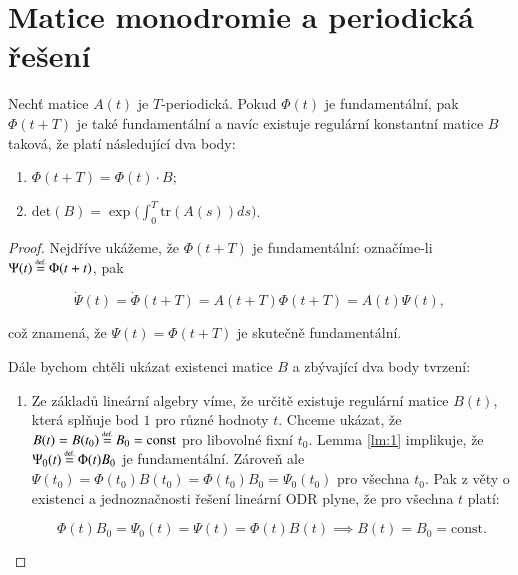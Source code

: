 \section{Matice monodromie a periodická řešení}\label{sec:monodromy_matrix_and_periodic_solutions}

\begin{thrm}\label{thrm:monodromy_matrix}
	Nechť matice $A(t)$ je $T$-periodická. Pokud $\Phi(t)$ je fundamentální, pak $\Phi(t+T)$ je také fundamentální a navíc existuje regulární konstantní matice $B$ taková, že platí následující dva body:
	
	\begin{enumerate}
		\item $\Phi(t+T) = \Phi(t) \cdot B$;
		\item $\mathrm{det} (B) = \exp \big( \int_{0}^{T} \mathrm{tr} (A(s)) ds \big) $.
	\end{enumerate}

	\begin{proof}
		Nejdříve ukážeme, že $\Phi(t+T)$ je fundamentální: označíme-li $\Psi(t) \defeq \Phi(t+t)$, pak
		
		\begin{equation}
			\dot{\Psi}(t) = \dot{\Phi}(t+T) = A(t+T) \Phi(t+T) = A(t) \Psi(t),
		\end{equation}
		
		\noindent
		což znamená, že $\Psi(t) = \Phi(t+T)$ je skutečně fundamentální.
		
		\medskip
		
		Dále bychom chtěli ukázat existenci matice $B$ a zbývající dva body tvrzení:
		
		\begin{enumerate}
			\item Ze základů lineární algebry víme, že určitě existuje regulární matice $B(t)$, která splňuje bod $1$ pro různé hodnoty $t$. Chceme ukázat, že $B(t) = B(t_{0}) \defeq B_{0} = \mathrm{const}$ pro libovolné fixní $t_{0}$. Lemma \ref{lm:1} implikuje, že $\Psi_{0}(t) \defeq \Phi(t) B_{0}$ je fundamentální. Zároveň ale $\Psi(t_{0}) = \Phi(t_{0}) B(t_{0}) = \Phi(t_{0}) B_{0} = \Psi_{0}(t_{0})$ pro všechna $t_{0}$. Pak z věty o existenci a jednoznačnosti řešení lineární ODR plyne, že pro všechna $t$ platí:
			
			\begin{equation}
				\Phi(t) B_{0} = \Psi_{0} (t) = \Psi (t) = \Phi (t) B(t) \implies B(t) = B_{0} = \mathrm{const}. 
			\end{equation}
			

\end{enumerate}
\end{proof}
\end{thrm}
